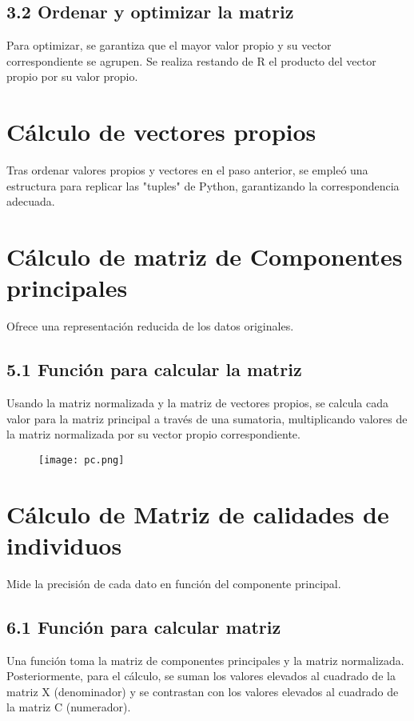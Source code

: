\documentclass{article}
\begin{document}
\subsection*{3.2 Ordenar y optimizar la matriz}
Para optimizar, se garantiza que el mayor valor propio y su vector correspondiente se agrupen. Se realiza restando de R el producto del vector propio por su valor propio.

\section{ Cálculo de vectores propios}Tras ordenar valores propios y vectores en el paso anterior, se empleó una estructura para replicar las "tuples" de Python, garantizando la correspondencia adecuada.

\section{Cálculo de matriz de Componentes principales}Ofrece una representación reducida de los datos originales.

\subsection*{5.1 Función para calcular la matriz}
Usando la matriz normalizada y la matriz de vectores propios, se calcula cada valor para la matriz principal a través de una sumatoria, multiplicando valores de la matriz normalizada por su vector propio correspondiente.

\begin{figure}[h]
    \centering
    \texttt{[image: pc.png]}
    \label{fig:my_label}
\end{figure}

\section{Cálculo de Matriz de calidades de individuos} Mide la precisión de cada dato en función del componente principal.

\subsection*{6.1 Función para calcular matriz}
Una función toma la matriz de componentes principales y la matriz normalizada. Posteriormente, para el cálculo, se suman los valores elevados al cuadrado de la matriz X (denominador) y se contrastan con los valores elevados al cuadrado de la matriz C (numerador).
\end{document}
